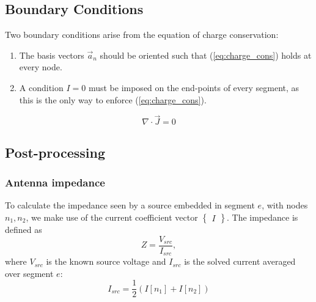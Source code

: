 \subsection{Boundary Conditions}
\label{sec:mom_bc}
Two boundary conditions arise from the equation of charge conservation:
\begin{enumerate}
	\item The basis vectors $\vec{a}_n$ should be oriented such that (\ref{eq:charge_cons}) holds at every node.
	\item A condition $I = 0$ must be imposed on the end-points of every segment, as this is the only way to enforce (\ref{eq:charge_cons}).
\end{enumerate}
\begin{equation}
	\nabla \cdot \vec{J} = 0
	\label{eq:charge_cons}	
\end{equation}

\subsection{Post-processing}

\subsubsection{Antenna impedance}
To calculate the impedance seen by a source embedded in segment $e$, with nodes $n_1, n_2$, we make use of the current coefficient vector $\begin{Bmatrix}
	I
\end{Bmatrix}$. The impedance is defined as
\begin{equation}
	Z = \frac{V_{src}}{I_{src}},
\end{equation}
where $V_{src}$ is the known source voltage and $I_{src}$ is the solved current averaged over segment $e$:
\begin{equation*}
	I_{src} = \frac{1}{2}\left( I[n_1] + I[n_2] \right)
\end{equation*}

